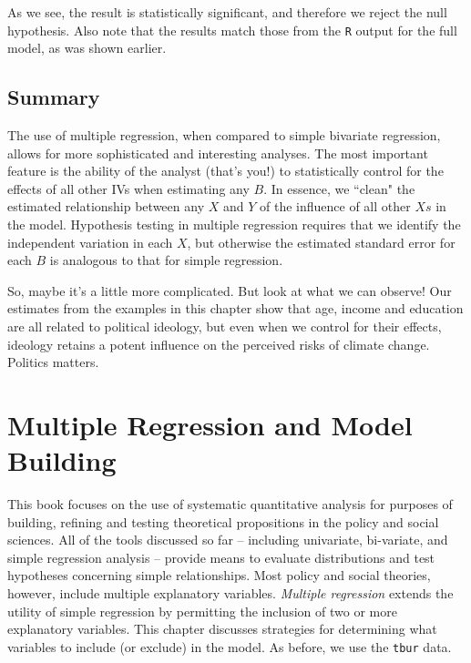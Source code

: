 \documentclass[11pt,openany]{book}\usepackage[]{graphicx}\usepackage[]{color}
\begin{document}
{As we see, the result is statistically significant, and therefore we reject the null hypothesis.  Also note that the results match those from the \texttt{R} output for the full model, as was shown earlier.

\section{Summary}
The use of multiple regression, when compared to simple bivariate regression, allows for more sophisticated and interesting analyses. The most important feature is the ability of the analyst (that's you!) to statistically control for the effects of all other IVs when estimating any $B$.
In essence, we ``clean" the estimated relationship between any $X$ and $Y$ of the influence of all  other $Xs$ in the model. Hypothesis testing in multiple regression requires that we identify the independent variation in each $X$, but otherwise the estimated standard error for each $B$ is analogous to that for simple regression.

So, maybe it's a little more complicated. But look at what we can observe! Our estimates from the examples in this chapter show that age, income and education are all related to political ideology, but even when we control for their effects, ideology retains a potent influence on the perceived
risks of climate change. Politics matters.








\chapter{Multiple Regression and Model Building} 

This book focuses on the use of systematic quantitative analysis for purposes of building, refining and testing theoretical propositions in the policy and social sciences. All of the tools discussed so far -- including univariate, bi-variate, and simple regression analysis -- provide means to evaluate distributions and test hypotheses concerning simple relationships. Most policy and social theories,  however, include multiple explanatory variables. \textit{Multiple regression} extends the utility of simple regression by permitting the inclusion of two or more explanatory variables.  This chapter discusses strategies for determining what variables to include (or exclude) in the model.  As before, we use the \texttt{tbur} data.  

}
\end{document}
